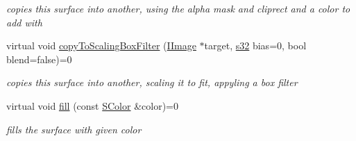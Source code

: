 \begin{DoxyCompactItemize}
\begin{DoxyCompactList}\small\item\em copies this surface into another, using the alpha mask and cliprect and a color to add with \end{DoxyCompactList}\item 
\mbox{\label{classirr_1_1video_1_1IImage_a651c196f681a105fabfb5ff4f6b28682}} 
virtual void \hyperlink{classirr_1_1video_1_1IImage_a651c196f681a105fabfb5ff4f6b28682}{copy\+To\+Scaling\+Box\+Filter} (\hyperlink{classirr_1_1video_1_1IImage}{I\+Image} $\ast$target, \hyperlink{namespaceirr_ac66849b7a6ed16e30ebede579f9b47c6}{s32} bias=0, bool blend=false)=0
\begin{DoxyCompactList}\small\item\em copies this surface into another, scaling it to fit, appyling a box filter \end{DoxyCompactList}\item 
\mbox{\label{classirr_1_1video_1_1IImage_a04973e101790130f611c4c6790e5b352}} 
virtual void \hyperlink{classirr_1_1video_1_1IImage_a04973e101790130f611c4c6790e5b352}{fill} (const \hyperlink{classirr_1_1video_1_1SColor}{S\+Color} \&color)=0
\begin{DoxyCompactList}\small\item\em fills the surface with given color \end{DoxyCompactList}\end{DoxyCompactItemize}
